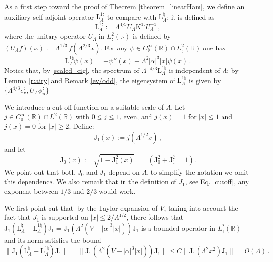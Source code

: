 \documentclass[a4paper,11pt,reqno]{amsart}
\theoremstyle{definition}
\numberwithin{equation}{section}
\newcommand{\RE}{\mathbb R}
\newcommand{\Lrm}{\mathrm{L}}
\newcommand{\bosfer}{{\natural}}
\begin{document}
As a first step toward the proof of Theorem \ref{theorem_linearHam}, we define an auxiliary self-adjoint operator $\Lrm_\Lambda^{1\bosfer}$  to compare with $\Lrm_\Lambda^\bosfer$; it is defined as
\begin{equation} \label{scaled_eig}
         \Lrm^{1\bosfer}_\Lambda :=\Lambda^{4/3}U_{\Lambda}\mathrm{K}^{1\bosfer}U^{-1}_{\Lambda} \, ,
    \end{equation}
where  the unitary operator $U_{\Lambda}$ in  $L^{2}_{\bosfer}(\RE)$ is defined by $ \left(U_{\Lambda}f \right)(x) := \Lambda^{1/3}\, f(\Lambda^{2/3} x)$. For any $\psi\in C^{\infty}_{0}(\RE)\cap L^{2}_{\bosfer}(\RE)$ one has
    \begin{equation*}%
  \Lrm^{1\bosfer}_\Lambda \psi(x)= -\psi''(x) + \Lambda^2  |\alpha|^3|x| \psi(x)\,.
    \end{equation*}
Notice that, by \eqref{scaled_eig}, the spectrum of  $\Lambda^{-4/3}\Lrm^{1\bosfer}_\Lambda$ is  independent of $\Lambda$; by Lemma \ref{r:airy} and Remark \ref{ev/odd}, the eigensystem of $\Lrm^{1\bosfer}_\Lambda$ is given by   $\{\Lambda^{4/3} e^{\bosfer}_{n}, U_{\Lambda}\phi^{\bosfer}_{n}\}$.\par
We introduce a cut-off function on a suitable scale of $\Lambda$. Let $j \in C^\infty_0(\RE)\cap L^{2}(\RE)$ with $0\leq j\leq1$, even,  and $j(x)=1$ for $|x| \leq 1$ and $j(x)=0$ for $|x| \geq 2$. Define:
    \begin{equation} \label{cutoff}
        \mathrm{J_1}(x) := j (\Lambda^{1/2} x) \, ,
    \end{equation}
and let 
    \begin{equation*} %
        \mathrm{J_0}(x) := \sqrt{1 - \mathrm{J^{2}_1}(x)} \qquad  ( \mathrm{J^{2}_0} +  \mathrm{J^{2}_1} = 1)  .
    \end{equation*}
We point out  that both $J_0$ and $J_1$ depend on $\Lambda$, to simplify the notation we omit this dependence. We also  remark that in the definition of $J_1$, see Eq. \eqref{cutoff}, any exponent between $1/3$ and $2/3$ would work. 

We first point out that, by the Taylor expansion of $V$, taking into account the fact that $J_1$ is supported on $|x|\leq 2/\Lambda^{1/2}$, there follows that   $\mathrm{J_1}\left( \Lrm_\Lambda^\bosfer -  \Lrm^{1\bosfer}_\Lambda\right) \mathrm{J_1} = \mathrm{J_1}\left(\Lambda^2 \left(V - |\alpha|^3|x| \right)\right) \mathrm{J_1}$ is a bounded operator in $L^{2}_{\bosfer}(\RE)$ and  its norm satisfies the bound 
    \begin{equation}\label{norm_estimate}
        \lVert \mathrm{J_1}\left( \Lrm_\Lambda^\bosfer -  \Lrm^{1\bosfer}_\Lambda\right) \mathrm{J_1}\rVert = \lVert \mathrm{J_1}\left(\Lambda^2 \left(V - |\alpha|^3|x| \right)\right) \mathrm{J_1}\rVert \leq C \lVert \mathrm{J_1} \left(\Lambda^2 x^2 \right)\mathrm{J_1}\rVert =  O\left(\Lambda\right) \, .
    \end{equation}
\end{document}
